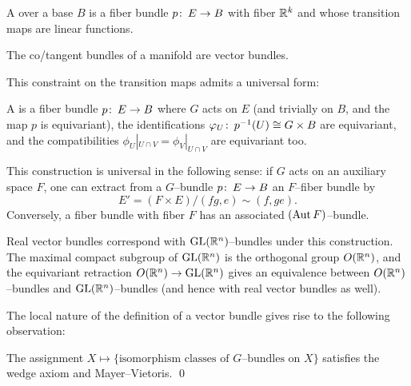 \begin{definition}
A  over a base $B$ is a fiber bundle $p\colon\thinspace E \to B$ with fiber $\mathbb R^k$ and whose transition maps are linear functions.
\end{definition}

\begin{example}
The co/tangent bundles of a manifold are vector bundles.
\end{example}

\noindent
This constraint on the transition maps admits a universal form:

\begin{definition}
A  is a fiber bundle $p\colon\thinspace E \to B$ where $G$ acts on $E$ (and trivially on $B$, and the map $p$ is equivariant), the identifications $\varphi_U\colon\thinspace p^{-1}(U) \cong G \times B$ are equivariant, and the compatibilities $\phi_U|_{U \cap V} = \phi_V|_{U \cap V}$ are equivariant too.
\end{definition}

\begin{remark}
This construction is universal in the following sense: if $G$ acts on an auxiliary space $F$, one can extract from a $G$--bundle $p\colon\thinspace E \to B$ an $F$--fiber bundle by \[E' = (F \times E) / (fg, e) \sim (f, ge).\]
Conversely, a fiber bundle with fiber $F$ has an associated $(\operatorname{Aut} F)$--bundle.
\end{remark}

\begin{example}
Real vector bundles correspond with $\mathrm{GL}(\mathbb R^n)$--bundles under this construction.
The maximal compact subgroup of $\mathrm{GL}(\mathbb R^n)$ is the orthogonal group $O(\mathbb R^n)$, and the equivariant retraction $O(\mathbb R^n) \to \mathrm{GL}(\mathbb R^n)$ gives an equivalence between $O(\mathbb R^n)$--bundles and $\mathrm{GL}(\mathbb R^n)$--bundles (and hence with real vector bundles as well).
\end{example}

The local nature of the definition of a vector bundle gives rise to the following observation:

\begin{lemma}
The assignment $X \mapsto \{\text{isomorphism classes of $G$--bundles on $X$}\}$ satisfies the wedge axiom and Mayer--Vietoris. \qed
\end{lemma}

